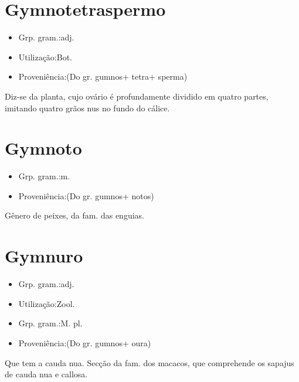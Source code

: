 \section{Gymnotetraspermo}
\begin{itemize}
\item {Grp. gram.:adj.}
\end{itemize}
\begin{itemize}
\item {Utilização:Bot.}
\end{itemize}
\begin{itemize}
\item {Proveniência:(Do gr. \textunderscore gumnos\textunderscore  + \textunderscore tetra\textunderscore  + \textunderscore sperma\textunderscore )}
\end{itemize}
Diz-se da planta, cujo ovário é profundamente dividido em quatro partes, imitando quatro grãos nus no fundo do cálice.
\section{Gymnoto}
\begin{itemize}
\item {Grp. gram.:m.}
\end{itemize}
\begin{itemize}
\item {Proveniência:(Do gr. \textunderscore gumnos\textunderscore  + \textunderscore notos\textunderscore )}
\end{itemize}
Gênero de peixes, da fam. das enguias.
\section{Gymnuro}
\begin{itemize}
\item {Grp. gram.:adj.}
\end{itemize}
\begin{itemize}
\item {Utilização:Zool.}
\end{itemize}
\begin{itemize}
\item {Grp. gram.:M. pl.}
\end{itemize}
\begin{itemize}
\item {Proveniência:(Do gr. \textunderscore gumnos\textunderscore  + \textunderscore oura\textunderscore )}
\end{itemize}
Que tem a cauda nua.
Secção da fam. dos macacos, que comprehende os sapajus de cauda nua e callosa.
